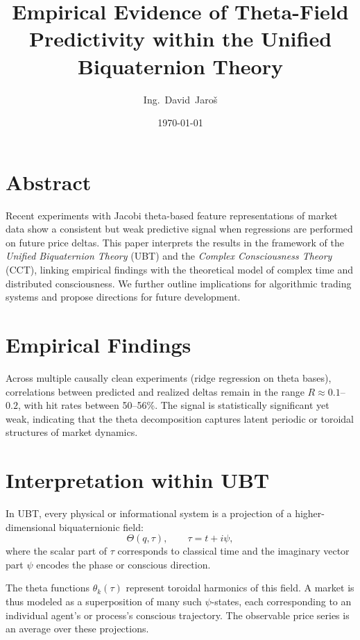 \documentclass[12pt]{article}
\title{Empirical Evidence of Theta-Field Predictivity within the Unified Biquaternion Theory}
\author{Ing.~David~Jaroš}
\date{\today}
\begin{document}
\maketitle

\section*{Abstract}
Recent experiments with Jacobi theta-based feature representations of market data
show a consistent but weak predictive signal when regressions are performed
on future price deltas.  
This paper interprets the results in the framework of the \emph{Unified Biquaternion Theory} (UBT)
and the \emph{Complex Consciousness Theory} (CCT), linking empirical findings
with the theoretical model of complex time and distributed consciousness.
We further outline implications for algorithmic trading systems and propose
directions for future development.

\section{Empirical Findings}
Across multiple causally clean experiments (ridge regression on theta bases),
correlations between predicted and realized deltas remain in the range
$R \approx 0.1$--$0.2$, with hit rates between 50--56\%.
The signal is statistically significant yet weak, indicating
that the theta decomposition captures latent periodic or toroidal
structures of market dynamics.

\section{Interpretation within UBT}
In UBT, every physical or informational system is a projection
of a higher-dimensional biquaternionic field:
\[
\Theta(q,\tau), \qquad \tau = t + i\psi,
\]
where the scalar part of $\tau$ corresponds to classical time
and the imaginary vector part $\psi$ encodes the phase or conscious direction.

The theta functions $\theta_k(\tau)$ represent toroidal harmonics
of this field.  
A market is thus modeled as a superposition of many such $\psi$-states,
each corresponding to an individual agent’s or process’s conscious trajectory.
The observable price series is an average over these projections.
\end{document}
